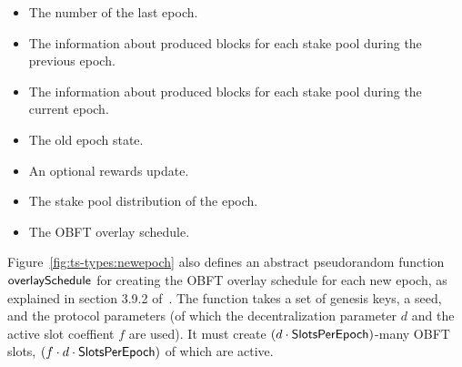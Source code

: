 \begin{itemize}
\item The number of the last epoch.
\item The information about produced blocks for each stake pool during the previous epoch.
\item The information about produced blocks for each stake pool during the current epoch.
\item The old epoch state.
\item An optional rewards update.
\item The stake pool distribution of the epoch.
\item The OBFT overlay schedule.
\end{itemize}

Figure~\ref{fig:ts-types:newepoch} also defines an abstract pseudorandom function
$\mathsf{overlaySchedule}$ for creating the OBFT overlay schedule for each new epoch,
as explained in section 3.9.2 of~\cite{delegation_design}.
The function takes a set of genesis keys, a seed, and the protocol parameters
(of which the decentralization parameter $d$ and the active slot coeffient $f$ are used).
It must create $(d\cdot\mathsf{SlotsPerEpoch})$-many OBFT slots, $(f\cdot d\cdot \mathsf{SlotsPerEpoch})$
of which are active.

